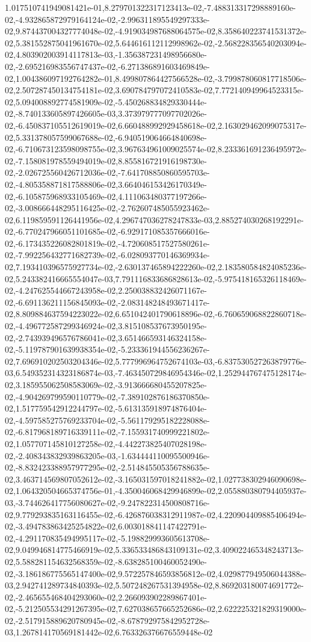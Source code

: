 1.017510741949081421e-01,8.279701322317123413e-02,-7.488313317298889160e-02,-4.932865872979164124e-02,-2.996311895549297333e-02,9.874437004327774048e-02,-4.919034987688064575e-02,8.358640223741531372e-02,5.381552875041961670e-02,5.644616112112998962e-02,-2.568228356540203094e-02,4.803902003914117813e-03,-1.356387231498956680e-02,-2.695216983556747437e-02,-6.271386891603469849e-02,1.004386097192764282e-01,8.499807864427566528e-02,-3.799878060817718506e-02,2.507287450134754181e-02,3.690784797072410583e-02,7.772140949964523315e-02,5.094008892774581909e-02,-5.450268834829330444e-02,-8.740133605897426605e-03,3.373979777097702026e-02,-6.450837105512619019e-02,6.660488992929458618e-02,2.163029462099075317e-02,5.331378057599067688e-02,-6.940519064664840698e-02,-6.710673123598098755e-02,3.967634961009025574e-02,8.233361691236495972e-02,-7.158081978559494019e-02,8.855816721916198730e-02,-2.026725560426712036e-02,-7.641708850860595703e-02,-4.805358871817588806e-02,3.664046153426170349e-02,-6.105875968933105469e-02,4.111063480377197266e-02,-3.008666448295116425e-02,-2.762607485055923462e-02,6.119859591126441956e-02,4.296747036278247833e-03,2.885274030268192291e-02,-6.770247966051101685e-02,-6.929171085357666016e-02,-6.173435226082801819e-02,-4.720608517527580261e-02,-7.992256432771682739e-02,-6.028093770146369934e-02,7.193410396575927734e-02,-2.630137465894222260e-02,2.183580584824085236e-02,5.243382416665554047e-03,7.791116833686828613e-02,-5.975418165326118469e-02,-4.247625544667243958e-02,2.250038832426071167e-02,-6.691136211156845093e-02,-2.083148248493671417e-02,8.809884637594223022e-02,6.651042401790618896e-02,-6.760659068822860718e-02,-4.496772587299346924e-02,3.815108537673950195e-02,-2.743939496576786041e-02,3.651466593146324158e-02,-5.119787901639938354e-02,-5.233361944556236267e-02,7.696910202503204346e-02,5.777996964752674103e-03,-6.837530527263879776e-03,6.549352314323186874e-03,-7.463450729846954346e-02,1.252944767475128174e-02,3.185955062508583069e-02,-3.913666680455207825e-02,-4.904269799590110779e-02,-7.389102876186370850e-02,1.517759542912244797e-02,-5.613135918974876404e-02,-4.597585275769233704e-02,-5.561179295182228088e-02,-6.817968189716339111e-02,-7.155931740999221802e-02,1.057707145810127258e-02,-4.442273825407028198e-02,-2.408343832939863205e-03,-1.634444110095500946e-02,-8.832423388957977295e-02,-2.514845505356788635e-02,3.463714569807052612e-02,-3.165031597018241882e-02,1.027738302946090698e-02,1.064320504665374756e-01,-4.350046068429946899e-02,2.055880380794405937e-03,-3.744626417756080627e-02,-9.247822314500808716e-02,9.779293835163116455e-02,-6.426876038312911987e-02,4.220904409885406494e-02,-3.494783863425254822e-02,6.003018841147422791e-02,-4.291170835494995117e-02,-5.198829993605613708e-02,9.049946814775466919e-02,5.336533486843109131e-02,3.409022465348243713e-02,5.588281154632568359e-02,-8.638285100460052490e-02,-3.186186775565147400e-02,9.572257846593856812e-02,4.029877949506044388e-03,2.942741289734840393e-02,5.507248267531394958e-02,8.869203180074691772e-02,-2.465655468404293060e-02,2.266093902289867401e-02,-5.212505534291267395e-02,7.627038657665252686e-02,2.622225321829319000e-02,-2.517915889620780945e-02,-8.678792975842952728e-03,1.267814170569181442e-02,6.763326376676559448e-02
